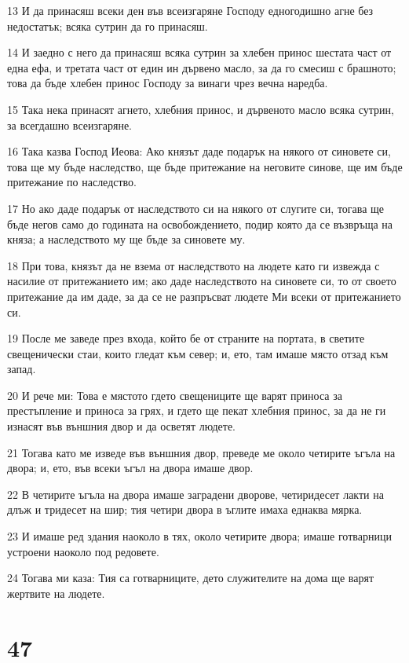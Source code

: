 \par 13 И да принасяш всеки ден във всеизгаряне Господу едногодишно агне без недостатък; всяка сутрин да го принасяш.
\par 14 И заедно с него да принасяш всяка сутрин за хлебен принос шестата част от една ефа, и третата част от един ин дървено масло, за да го смесиш с брашното; това да бъде хлебен принос Господу за винаги чрез вечна наредба.
\par 15 Така нека принасят агнето, хлебния принос, и дървеното масло всяка сутрин, за всегдашно всеизгаряне.
\par 16 Така казва Господ Иеова: Ако князът даде подарък на някого от синовете си, това ще му бъде наследство, ще бъде притежание на неговите синове, ще им бъде притежание по наследство.
\par 17 Но ако даде подарък от наследството си на някого от слугите си, тогава ще бъде негов само до годината на освобождението, подир която да се възвръща на княза; а наследството му ще бъде за синовете му.
\par 18 При това, князът да не взема от наследството на людете като ги извежда с насилие от притежанието им; ако даде наследството на синовете си, то от своето притежание да им даде, за да се не разпръсват людете Ми всеки от притежанието си.
\par 19 После ме заведе през входа, който бе от страните на портата, в светите свещенически стаи, които гледат към север; и, ето, там имаше място отзад към запад.
\par 20 И рече ми: Това е мястото гдето свещениците ще варят приноса за престъпление и приноса за грях, и гдето ще пекат хлебния принос, за да не ги изнасят във външния двор и да осветят людете.
\par 21 Тогава като ме изведе във външния двор, преведе ме около четирите ъгъла на двора; и, ето, във всеки ъгъл на двора имаше двор.
\par 22 В четирите ъгъла на двора имаше заградени дворове, четиридесет лакти на длъж и тридесет на шир; тия четири двора в ъглите имаха еднаква мярка.
\par 23 И имаше ред здания наоколо в тях, около четирите двора; имаше готварници устроени наоколо под редовете.
\par 24 Тогава ми каза: Тия са готварниците, дето служителите на дома ще варят жертвите на людете.

\chapter{47}

